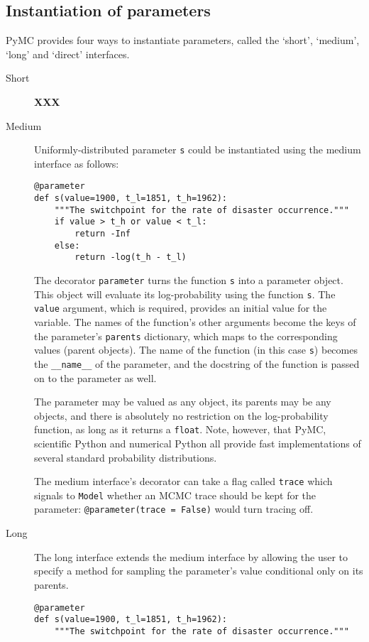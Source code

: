 \subsection{Instantiation of parameters}
PyMC provides four ways to instantiate parameters, called the `short', `medium', `long' and `direct' interfaces.
\begin{description}
    \item[Short] \textbf{XXX}
    \item[Medium] Uniformly-distributed parameter \texttt{s} could be instantiated using the medium interface as follows:
    \begin{verbatim}
@parameter
def s(value=1900, t_l=1851, t_h=1962):
    """The switchpoint for the rate of disaster occurrence."""
    if value > t_h or value < t_l:
        return -Inf
    else:
        return -log(t_h - t_l) 
    \end{verbatim}
    The decorator \texttt{parameter} turns the function \texttt{s} into a parameter object. This object will evaluate its log-probability using the function \texttt{s}. The \texttt{value} argument, which is required, provides an initial value for the variable. The names of the function's other arguments become the keys of the parameter's \texttt{parents} dictionary, which maps to the corresponding values (parent objects). The name of the function (in this case \texttt{s}) becomes the \texttt{\_\_name\_\_} of the parameter, and the docstring of the function is passed on to the parameter as well.

The parameter may be valued as any object, its parents may be any objects, and there is absolutely no restriction on the log-probability function, as long as it returns a \texttt{float}. Note, however, that PyMC, scientific Python and numerical Python all provide fast implementations of several standard probability distributions.

    The medium interface's decorator can take a flag called \texttt{trace} which signals to \texttt{Model} whether an MCMC trace should be kept for the parameter: \texttt{@parameter(trace = False)} would turn tracing off.

    \item[Long] The long interface extends the medium interface by allowing the user to specify a method for sampling the parameter's value conditional only on its parents.
    \begin{verbatim}
@parameter
def s(value=1900, t_l=1851, t_h=1962):
    """The switchpoint for the rate of disaster occurrence."""


\end{verbatim}
\end{description}
